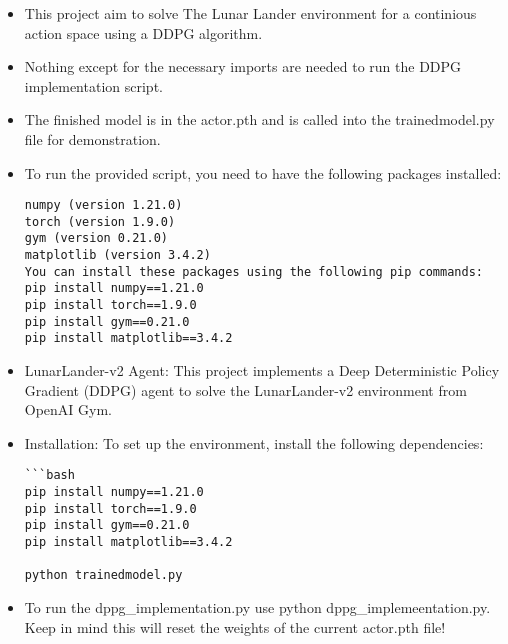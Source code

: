 \documentclass[conference]{IEEEtran}
\begin{document}
\begin{itemize}
\item This project aim to solve The Lunar Lander environment for a continious action space using a DDPG algorithm.

\item Nothing except for the necessary imports are needed to run the DDPG implementation script.

\item The finished model is in the actor.pth and is called into the trainedmodel.py file for demonstration. 

\item To run the provided script, you need to have the following packages installed:
\begin{verbatim}
numpy (version 1.21.0)
torch (version 1.9.0)
gym (version 0.21.0)
matplotlib (version 3.4.2)
You can install these packages using the following pip commands:
pip install numpy==1.21.0
pip install torch==1.9.0
pip install gym==0.21.0
pip install matplotlib==3.4.2
\end{verbatim}

\item LunarLander-v2 Agent: This project implements a Deep Deterministic Policy Gradient (DDPG) agent to solve the LunarLander-v2 environment from OpenAI Gym.

\item Installation: To set up the environment, install the following dependencies:

\begin{verbatim}
```bash
pip install numpy==1.21.0
pip install torch==1.9.0
pip install gym==0.21.0
pip install matplotlib==3.4.2

python trainedmodel.py

\end{verbatim}

\item To run the dppg\_implementation.py use python dppg\_implemeentation.py. Keep in mind this will reset the weights of the current actor.pth file!



\end{itemize}
\end{document}

